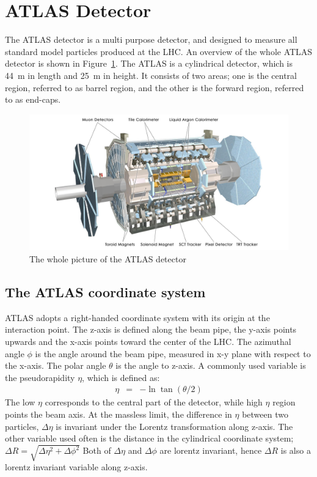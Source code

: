 \section{ATLAS Detector}
\label{sec:detector}
The ATLAS detector is a multi purpose detector, and designed to measure all standard model particles produced at the LHC.
An overview of the whole ATLAS detector is shown in Figure~\ref{fig:ATLAS}.
The ATLAS is a cylindrical detector, which is 44~m in length and 25~m in height. It consists of two areas; one is the central region, referred to as barrel region, and the other is the forward region, referred to as end-caps.
\begin{figure}[tbp]
\begin{center}
 \includegraphics[width=1.0\textwidth,keepaspectratio]{figures/detector/ATLAS}
\caption{
The whole picture of the ATLAS detector
}
\label{fig:ATLAS}
\end{center}
\end{figure}

\subsection{The ATLAS coordinate system}
ATLAS adopts a right-handed coordinate system with its origin at the interaction point. The z-axis is defined along the beam pipe, the y-axis points upwards and the x-axis points toward the center of the LHC. The azimuthal angle $\phi$ is the angle around the beam pipe, measured in x-y plane with respect to the x-axis. The polar angle $\theta$ is the angle to z-axis. A commonly used variable is the pseudorapidity $\eta$, which is defined as:
\begin{eqnarray*}
\eta &=& -\ln\tan(\theta/2)
\end{eqnarray*}
The low $\eta$ corresponds to the central part of the detector, while high $\eta$ region points the beam axis. At the massless limit, the difference in $\eta$ between two particles, $\Delta\eta$ is invariant under the Lorentz transformation along z-axis.
The other variable used often is the distance in the cylindrical coordinate system;
$
\Delta R = \sqrt{\Delta \eta^2 + \Delta \phi^2}
$
Both of $\Delta \eta$ and $\Delta \phi$ are lorentz invariant, hence $\Delta R$ is also a lorentz invariant variable along z-axis.

